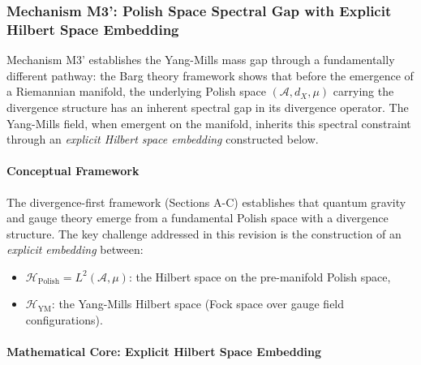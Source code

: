 
\subsubsection{Mechanism M3': Polish Space Spectral Gap with Explicit Hilbert Space Embedding}
\label{subsec:mechanismM3PolishSpectral}

Mechanism M3' establishes the Yang-Mills mass gap through a fundamentally different pathway: the Barg theory framework shows that before the emergence of a Riemannian manifold, the underlying Polish space $(\mathcal{A}, d_X, \mu)$ carrying the divergence structure has an inherent spectral gap in its divergence operator. The Yang-Mills field, when emergent on the manifold, inherits this spectral constraint through an \emph{explicit Hilbert space embedding} constructed below.

\paragraph{Conceptual Framework}

The divergence-first framework (Sections A-C) establishes that quantum gravity and gauge theory emerge from a fundamental Polish space with a divergence structure. The key challenge addressed in this revision is the construction of an \emph{explicit embedding} between:
\begin{itemize}
\item $\mathcal{H}_{\mathrm{Polish}} = L^2(\mathcal{A}, \mu)$: the Hilbert space on the pre-manifold Polish space,
\item $\mathcal{H}_{\mathrm{YM}}$: the Yang-Mills Hilbert space (Fock space over gauge field configurations).
\end{itemize}

\paragraph{Mathematical Core: Explicit Hilbert Space Embedding}

